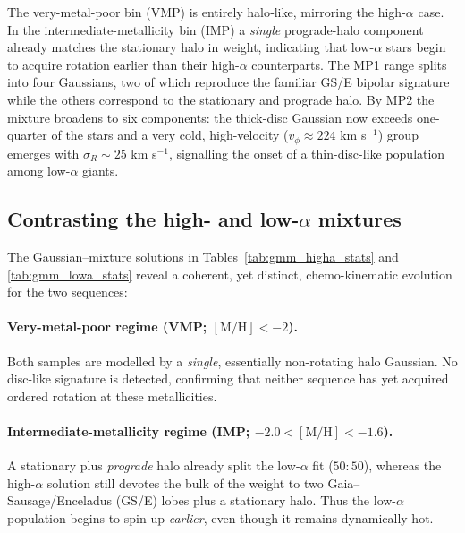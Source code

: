 \documentclass[a4paper,12pt]{article}
\begin{document}
The very-metal-poor bin (VMP) is entirely halo‐like, mirroring the high-$\alpha$ case.  
In the intermediate-metallicity bin (IMP) a \emph{single} prograde-halo component already matches the stationary halo in weight, indicating that low-$\alpha$ stars begin to acquire rotation earlier than their high-$\alpha$ counterparts.  
The MP1 range splits into four Gaussians, two of which reproduce the familiar GS/E bipolar signature while the others correspond to the stationary and prograde halo.  
By MP2 the mixture broadens to six components: the thick-disc Gaussian now exceeds one-quarter of the stars and a very cold, high-velocity ($v_\phi\!\approx\!224$ km s$^{-1}$) group emerges with \(\sigma_R\!\sim\!25\) km s$^{-1}$, signalling the onset of a thin-disc-like population among low-$\alpha$ giants.

\subsection{Contrasting the high- and low-\texorpdfstring{$\alpha$}{α} mixtures}
\label{subsec:gmm_comparison}

The Gaussian–mixture solutions in
Tables~\ref{tab:gmm_higha_stats} and \ref{tab:gmm_lowa_stats}
reveal a coherent, yet distinct, chemo-kinematic evolution for the
two sequences:

\paragraph{Very-metal-poor regime (\textbf{VMP}; $[\mathrm{M/H}]<-2$).}
Both samples are modelled by a \emph{single}, essentially
non-rotating halo Gaussian.  No disc-like signature is detected,
confirming that neither sequence has yet acquired ordered
rotation at these metallicities.

\paragraph{Intermediate-metallicity regime (\textbf{IMP};
$-2.0<[\mathrm{M/H}]<-1.6$).}
A stationary plus \emph{prograde} halo already split the
\mbox{low-$\alpha$} fit ($50{:}50$), whereas the high-$\alpha$
solution still devotes the bulk of the weight to two
Gaia–Sausage/Enceladus (GS/E) lobes plus a stationary halo.
Thus the \mbox{low-$\alpha$} population begins to spin up
\emph{earlier}, even though it remains dynamically hot.
\end{document}
